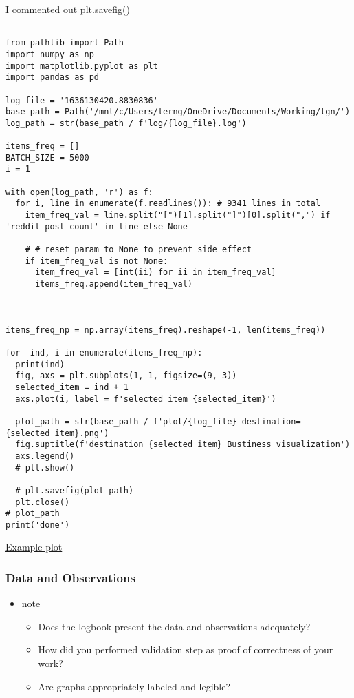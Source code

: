\documentclass[11pt]{article}
\begin{document}
I commented out plt.savefig()
\begin{verbatim}

from pathlib import Path
import numpy as np
import matplotlib.pyplot as plt
import pandas as pd

log_file = '1636130420.8830836'
base_path = Path('/mnt/c/Users/terng/OneDrive/Documents/Working/tgn/')
log_path = str(base_path / f'log/{log_file}.log')

items_freq = []
BATCH_SIZE = 5000
i = 1

with open(log_path, 'r') as f:
  for i, line in enumerate(f.readlines()): # 9341 lines in total
    item_freq_val = line.split("[")[1].split("]")[0].split(",") if 'reddit post count' in line else None

    # # reset param to None to prevent side effect
    if item_freq_val is not None:
      item_freq_val = [int(ii) for ii in item_freq_val]
      items_freq.append(item_freq_val)



items_freq_np = np.array(items_freq).reshape(-1, len(items_freq))

for  ind, i in enumerate(items_freq_np):
  print(ind)
  fig, axs = plt.subplots(1, 1, figsize=(9, 3))
  selected_item = ind + 1
  axs.plot(i, label = f'selected item {selected_item}')

  plot_path = str(base_path / f'plot/{log_file}-destination={selected_item}.png')
  fig.suptitle(f'destination {selected_item} Bustiness visualization')
  axs.legend()
  # plt.show()

  # plt.savefig(plot_path)
  plt.close()
# plot_path
print('done')
\end{verbatim}

\href{file:///mnt/c/Users/terng/OneDrive/Documents/Working/tgn/plot/1636130420.8830836-destination=1.png}{Example plot}

\subsubsection{Data and Observations}
\label{sec:org2d056d0}
\begin{itemize}
\item note
\begin{itemize}
\item Does the logbook present the data and observations adequately?
\item How did you performed validation step as proof of correctness of your work?
\item Are graphs appropriately labeled and legible?
\end{itemize}
\end{itemize}
\end{document}
